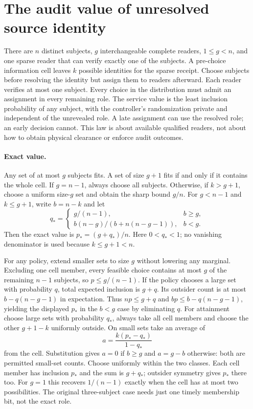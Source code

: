 \documentclass{article}
\begin{document}
\section*{The audit value of unresolved source identity}
There are $n$ distinct subjects, $g$ interchangeable complete readers,
$1\le g<n$, and one sparse reader that can verify exactly one of the
subjects. A pre-choice information cell leaves $k$ possible identities
for the sparse receipt. Choose subjects before resolving the identity
but assign them to readers afterward. Each reader verifies at most one
subject. Every choice in the distribution must admit an assignment in
every remaining role. The service value is the least inclusion
probability of any subject, with the controller's randomization private
and independent of the unrevealed role. A late assignment can use the
resolved role; an early decision cannot. This law is about available
qualified readers, not about how to obtain physical clearance or
enforce audit outcomes.

\paragraph{Exact value.}
Any set of at most $g$ subjects fits. A set of size $g+1$ fits if and
only if it contains the whole cell. If $g=n-1$, always choose all
subjects. Otherwise, if $k>g+1$, choose a uniform size-$g$ set and
obtain the sharp bound $g/n$. For $g<n-1$ and $k\le g+1$, write
$b=n-k$ and let
\[
q_*=\begin{cases}
g/(n-1), & b\ge g,\\
b(n-g)/(b+n(n-g-1)), & b<g .
\end{cases}
\]
Then the exact value is $p_*=(g+q_*)/n$. Here $0<q_*<1$; no
vanishing denominator is used because $k\le g+1<n$.

For any policy, extend smaller sets to size $g$ without lowering any
marginal. Excluding one cell member, every feasible choice contains
at most $g$ of the remaining $n-1$ subjects, so $p\le g/(n-1)$.
If the policy chooses a large set with probability $q$, total
expected inclusion is $g+q$. Its outsider count is at most
$b-q(n-g-1)$ in expectation. Thus $np\le g+q$ and
$bp\le b-q(n-g-1)$, yielding the displayed $p_*$ in the $b<g$
case by eliminating $q$. For attainment choose large sets with
probability $q_*$, always take all cell members and choose the other
$g+1-k$ uniformly outside. On small sets take an average of
\[
a=\frac{k(p_*-q_*)}{1-q_*}
\]
from the cell. Substitution gives $a=0$ if $b\ge g$ and $a=g-b$
otherwise: both are permitted small-set counts. Choose uniformly
within the two classes. Each cell member has inclusion $p_*$ and
the sum is $g+q_*$; outsider symmetry gives $p_*$ there too.
For $g=1$ this recovers $1/(n-1)$ exactly when the cell has at
most two possibilities. The original three-subject case needs just
one timely membership bit, not the exact role.
\end{document}
